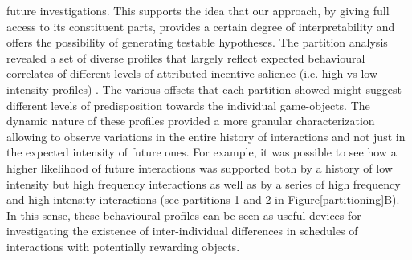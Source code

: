 future investigations. This supports the idea that our approach, by giving full access to its constituent parts, provides a certain degree of interpretability and offers the possibility of generating testable hypotheses. The partition analysis revealed a set of diverse profiles that largely reflect expected behavioural correlates of different levels of attributed incentive salience (i.e. high vs low intensity profiles) \cite{berridge2004motivation}. The various offsets that each partition showed might suggest different levels of predisposition towards the individual game-objects. The dynamic nature of these profiles provided a more granular characterization allowing to observe variations in the entire history of interactions and not just in the expected intensity of future ones. For example, it was possible to see how a higher likelihood of future interactions was supported both by a history of low intensity but high frequency interactions as well as by a series of high frequency and high intensity interactions (see partitions 1 and 2 in Figure\ref{partitioning}B). In this sense, these behavioural profiles can be seen as useful devices for investigating the existence of inter-individual differences in schedules of interactions with potentially rewarding objects.
